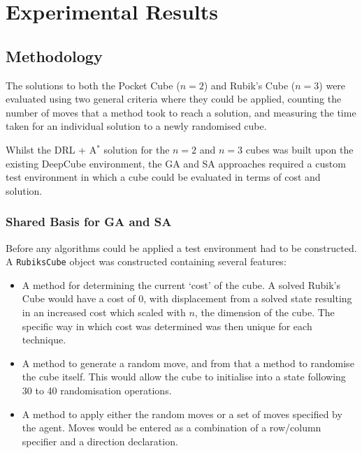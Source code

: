 \documentclass[UKenglish]{svproc}
\begin{document}

\section{Experimental Results}

\subsection{Methodology}
The solutions to both the Pocket Cube ($n=2$) and Rubik's Cube ($n=3$) were evaluated using two general criteria where they could be applied, counting the number of moves that a method took to reach a solution, and measuring the time taken for an individual solution to a newly randomised cube.

Whilst the DRL + A$^{\ast}$ solution for the $n=2$ and $n=3$ cubes was built upon the existing DeepCube environment, the GA and SA approaches required a custom test environment in which a cube could be evaluated in terms of cost and solution.

\subsubsection{Shared Basis for GA and SA}
Before any algorithms could be applied a test environment had to be constructed. A \verb|RubiksCube| object was constructed containing several features:
\begin{itemize}
    \item A method for determining the current `cost' of the cube. A solved Rubik's Cube would have a cost of 0, with displacement from a solved state resulting in an increased cost which scaled with $n$, the dimension of the cube. The specific way in which cost was determined was then unique for each technique.
    \item A method to generate a random move, and from that a method to randomise the cube itself. This would allow the cube to initialise into a state following 30 to 40 randomisation operations.
    \item A method to apply either the random moves or a set of moves specified by the agent. Moves would be entered as a combination of a row/column specifier and a direction declaration.
\end{itemize}
\end{document}
